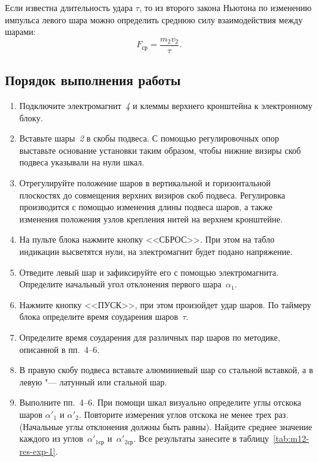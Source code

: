 \documentclass[a4paper, 12pt]{extarticle}
\begin{document}
Если известна длительность удара $\tau$, то из второго закона Ньютона по изменению импульса левого шара можно определить среднюю силу взаимодействия между шарами: %
\begin{equation}
\label{eq:m12-2nd-newton's-law}
F_\text{ср} = \frac{m_2 v_2}{\tau}. %
\end{equation}

\subsection{Порядок выполнения работы}
\begin{enumerate}
\item Подключите электромагнит~\emph{4} и клеммы верхнего кронштейна к электронному блоку.
\item Вставьте шары~\emph{2} в скобы подвеса. С помощью регулировочных опор выставьте основание установки таким образом, чтобы нижние визиры скоб подвеса указывали на нули шкал.
\item Отрегулируйте положение шаров в вертикальной и горизонтальной плоскостях до совмещения верхних визиров скоб подвеса. Регулировка производится с помощью изменения длины подвеса шаров, а также изменения положения узлов крепления нитей на верхнем кронштейне.
\item На пульте блока нажмите кнопку <<СБРОС>>. При этом на табло индикации высветятся нули, на электромагнит будет подано напряжение.
\item Отведите левый шар и зафиксируйте его с помощью электромагнита. Определите начальный угол отклонения первого шара~$\alpha_1$.
\item Нажмите кнопку <<ПУСК>>, при этом произойдет удар шаров. По таймеру блока определите время соударения шаров~$\tau$.
\item Определите время соударения для различных пар шаров по методике, описанной в пп.~4--6.
\item В правую скобу подвеса вставьте алюминиевый шар со стальной вставкой, а в левую "--- латунный или стальной шар.
\item Выполните пп.~4--6. При помощи шкал визуально определите углы отскока шаров $\alpha'_1$  и $\alpha'_2$. Повторите измерения углов отскока не менее  трех раз. (Начальные углы отклонения должны быть равны). Найдите среднее значение каждого из углов~$\alpha'_{1\text{ср}}$ и~$\alpha'_{2\text{ср}}$. Все результаты занесите в таблицу~\ref{tab:m12-res-exp-1}. %

\end{enumerate}
\end{document}
